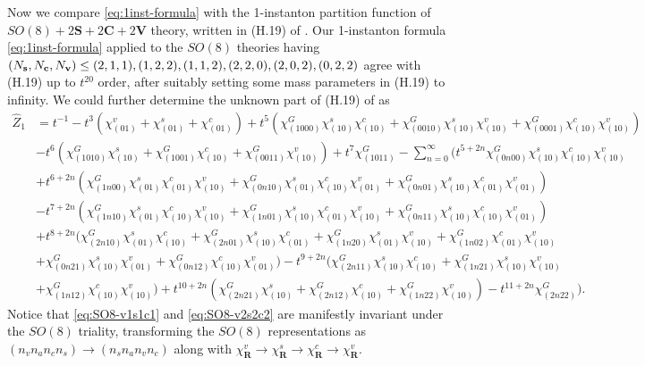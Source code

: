 \documentclass[letterpaper, 11pt]{article}
\newcommand{\nn}{\nonumber}
\begin{document}
{Now we compare \eqref{eq:1inst-formula} with the 1-instanton partition function of $SO(8) + 2\mathbf{S}
 + 2\mathbf{C} + 2\mathbf{V}$ theory, written in (H.19) of \cite{DelZotto:2018tcj}. Our 1-instanton formula \eqref{eq:1inst-formula} applied to the $SO(8)$ theories having $( N_{\bf s},  N_{\bf c}, N_{\bf v}) \leq (2,1,1), (1,2,2), (1,1,2),(2,2,0),(2,0,2),(0,2,2)$ agree with (H.19) up to $t^{20}$ order, after suitably setting some mass parameters in (H.19) to infinity. We could further determine the unknown part of (H.19) of \cite{DelZotto:2018tcj} as 
 \begin{align}
  \label{eq:SO8-v2s2c2}
  \hat{Z}_1 &= t^{-1} - t^3(\chi_{(01)}^v+\chi_{(01)}^s+\chi_{(01)}^c) 
  +t^5(\chi^G_{(1000)}\chi^s_{(10)}\chi^c_{(10)}+\chi^G_{(0010)}\chi^s_{(10)}\chi^v_{(10)}+\chi^G_{(0001)}\chi^c_{(10)}\chi^v_{(10)}) \nn \\&
  -t^6(\chi^G_{(1010)}\chi_{(10)}^s+\chi^G_{(1001)}\chi_{(10)}^c+\chi^G_{(0011)}\chi_{(10)}^v) + t^7 \chi_{(1011)}^G - \sum_{n=0}^\infty \Big(t^{5+2n}\chi_{(0n00)}^G \chi^s_{(10)}\chi^c_{(10)} \chi^v_{(10)}  \nn \\&
  + t^{6+2n}(\chi^G_{(1n00)}\chi^s_{(01)}\chi^c_{(01)}\chi^v_{(10)}+\chi^G_{(0n10)}\chi^s_{(01)}\chi^c_{(10)}\chi^v_{(01)}+\chi^G_{(0n01)}\chi^s_{(10)}\chi^c_{(01)}\chi^v_{(01)}) \nn \\&- t^{7+2n} 
  (\chi^G_{(1n10)}\chi^s_{(01)}\chi^c_{(10)}\chi^v_{(10)}+\chi^G_{(1n01)}\chi^s_{(10)}\chi^c_{(01)}\chi^v_{(10)}+\chi^G_{(0n11)}\chi^s_{(10)}\chi^c_{(10)}\chi^v_{(01)})  \\& +  t^{8+2n}
  (\chi^G_{(2n10)}\chi^s_{(01)}\chi^c_{(10)}+\chi^G_{(2n01)}\chi^s_{(10)}\chi^c_{(01)}+\chi^G_{(1n20)}\chi^s_{(01)}\chi^v_{(10)}+\chi^G_{(1n02)}\chi^c_{(01)}\chi^v_{(10)} \nn\\&
  +\chi^G_{(0n21)}\chi^s_{(10)}\chi^v_{(01)}+\chi^G_{(0n12)}\chi^c_{(10)}\chi^v_{(01)}) - t^{9+2n}(\chi^G_{(2n11)}\chi^s_{(10)}\chi^c_{(10)}+\chi^G_{(1n21)}\chi^s_{(10)}\chi^v_{(10)} \nn\\&
  +\chi^G_{(1n12)}\chi^c_{(10)}\chi^v_{(10)}) +  t^{10+2n} (\chi^G_{(2n21)}\chi^s_{(10)}+\chi^G_{(2n12)}\chi^c_{(10)} + \chi^G_{(1n22)}\chi^v_{(10)}) -  t^{11+2n} \chi^G_{(2n22)}\Big). \nn
\end{align}
Notice that \eqref{eq:SO8-v1s1c1} and \eqref{eq:SO8-v2s2c2} are manifestly invariant under the $SO(8)$ triality, transforming the $SO(8)$ representations as $(n_vn_an_cn_s) \rightarrow (n_sn_an_vn_c)$ 
along with $\chi^v_\mathbf{R} \rightarrow \chi^s_\mathbf{R} \rightarrow \chi^c_\mathbf{R} \rightarrow \chi^v_\mathbf{R}$.
}
\end{document}
